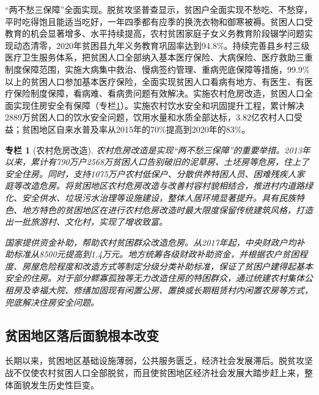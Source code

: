 \documentclass{ctexart}
\newtheorem{zhuanlan}{专栏}
\begin{document}
“两不愁三保障”全面实现。脱贫攻坚普查显示，贫困户全面实现不愁吃、不愁穿，平时吃得饱且能适当吃好，一年四季都有应季的换洗衣物和御寒被褥。贫困人口受教育的机会显著增多、水平持续提高，农村贫困家庭子女义务教育阶段辍学问题实现动态清零，2020年贫困县九年义务教育巩固率达到94.8\%。持续完善县乡村三级医疗卫生服务体系，把贫困人口全部纳入基本医疗保险、大病保险、医疗救助三重制度保障范围，实施大病集中救治、慢病签约管理、重病兜底保障等措施，99.9\%以上的贫困人口参加基本医疗保险，全面实现贫困人口看病有地方、有医生、有医疗保险制度保障，看病难、看病贵问题有效解决。实施农村危房改造，贫困人口全面实现住房安全有保障（专栏\ref{col-1}）。实施农村饮水安全和巩固提升工程，累计解决2889万贫困人口的饮水安全问题，饮用水量和水质全部达标，3.82亿农村人口受益；贫困地区自来水普及率从2015年的70\%提高到2020年的83\%。

\begin{zhuanlan}[农村危房改造]

农村危房改造是实现“两不愁三保障”的重要举措。2013年以来，累计有790万户2568万贫困人口告别破旧的泥草房、土坯房等危房，住上了安全住房。同时，支持1075万户农村低保户、分散供养特困人员、困难残疾人家庭等改造危房。将贫困地区农村危房改造与改善村容村貌相结合，推进村内道路绿化、安全供水、垃圾污水治理等设施建设，整体人居环境显著提升。具有民族特色、地方特色的贫困地区在进行农村危房改造时最大限度保留传统建筑风格，打造出一批旅游村、文化村，实现了增收致富。

国家提供资金补助，帮助农村贫困群众改造危房。从2017年起，中央财政户均补助标准从8500元提高到1.4万元。地方统筹各级财政补助资金，并根据农户贫困程度、房屋危险程度和改造方式等制定分级分类补助标准，保证了贫困户建得起基本安全的住房。对于部分鳏寡孤独等无力改造住房的特困群众，通过统建农村集体公租房及幸福大院、修缮加固现有闲置公房、置换或长期租赁村内闲置农房等方式，兜底解决住房安全问题。

\label{col-1}

\end{zhuanlan}

\subsection{贫困地区落后面貌根本改变}

长期以来，贫困地区基础设施薄弱，公共服务匮乏，经济社会发展滞后。脱贫攻坚战不仅使农村贫困人口全部脱贫，而且使贫困地区经济社会发展大踏步赶上来，整体面貌发生历史性巨变。
\end{document}
